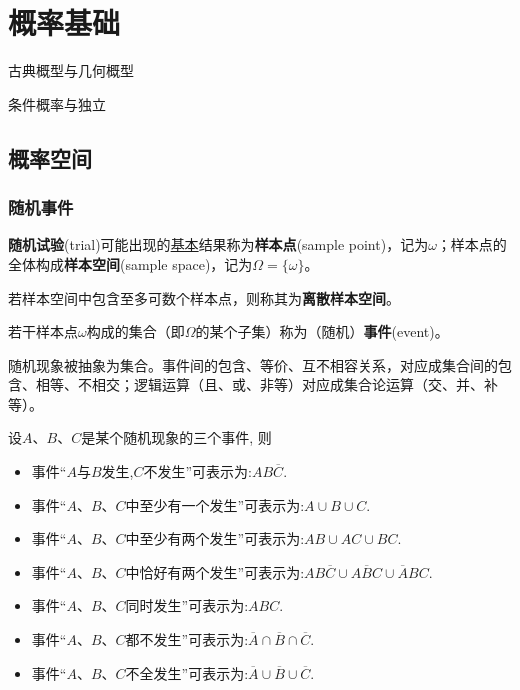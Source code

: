 \chapter{概率基础}\label{chap:probability_space}

\begin{introduction}[考试重点]
    \item 古典概型与几何概型
    \item 条件概率与独立
\end{introduction}

\section{概率空间}

\subsection{随机事件}

\begin{definition}[样本空间]
    \textbf{随机试验}(trial)可能出现的\underline{基本}结果称为\textbf{样本点}(sample point)，记为$\omega$；样本点的全体构成\textbf{样本空间}(sample space)，记为$\Omega=\{ \omega \}$。
\end{definition}

\begin{definition}[离散样本空间]\label{def:discrete_sample_space}
    若样本空间中包含至多可数个样本点，则称其为\textbf{离散样本空间}。
\end{definition}

\begin{definition}[事件的古典定义]
    若干样本点$\omega$构成的集合（即$\Omega$的某个子集）称为（随机）\textbf{事件}(event)。
\end{definition}

随机现象被抽象为集合。事件间的包含、等价、互不相容关系，对应成集合间的包含、相等、不相交；逻辑运算（且、或、非等）对应成集合论运算（交、并、补等）。

\begin{example}
    设$A$、$B$、$C$是某个随机现象的三个事件, 则
    \begin{itemize}
        \item 事件“$A$与$B$发生,$C$不发生”可表示为:$AB\overline{C}$.
        \item 事件“$A$、$B$、$C$中至少有一个发生”可表示为:$A \cup B \cup C$.
        \item 事件“$A$、$B$、$C$中至少有两个发生”可表示为:$AB \cup AC \cup BC$.
        \item 事件“$A$、$B$、$C$中恰好有两个发生”可表示为:$AB\overline{C} \cup A\overline{B}C \cup \overline{A}BC$.
        \item 事件“$A$、$B$、$C$同时发生”可表示为:$ABC$.
        \item 事件“$A$、$B$、$C$都不发生”可表示为:$\overline{A} \cap \overline{B} \cap \overline{C}$.
        \item 事件“$A$、$B$、$C$不全发生”可表示为:$\overline{A} \cup \overline{B} \cup \overline{C}$.
    \end{itemize}
\end{example}

